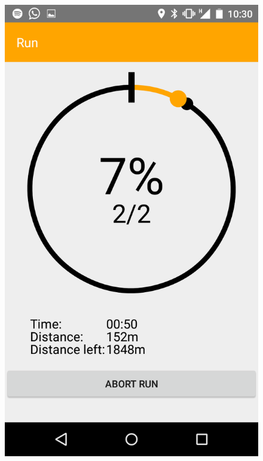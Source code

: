 \begin{figure}
\centering
\begin{minipage}{.4\textwidth}
  \centering
  \includegraphics[width=.8\linewidth]{abb/bsp/bsp17}
  \label{fig:bsp17}
\end{minipage}
\begin{minipage}{.4\textwidth}
  \centering

\end{minipage}
\end{figure}
